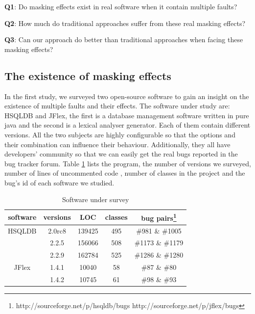 \documentclass{sig-alternate}
\begin{document}
\textbf{Q1}: Do masking effects exist in real software when it contain multiple faults?

\textbf{Q2}: How much do traditional approaches suffer from these real masking effects?

\textbf{Q3}: Can our approach do better than traditional approaches when facing these masking effects?
%

\subsection{The existence of masking effects}
In the first study, we surveyed two open-source software to gain an insight on the existence of multiple faults and their effects. The software under study are: HSQLDB and JFlex, the first is a database management software written in pure java and the second is a lexical analyser generator. Each of them contain different versions. All the two subjects are highly configurable so that the options and their combination can influence their behaviour. Additionally, they all have developers' community so that we can easily get the real bugs reported in the bug tracker forum. Table \ref{software description} lists the program, the number of versions we surveyed, number of lines of uncommented code , number of classes in the project and the bug's id of each software we studied.

\begin{table}\renewcommand{\arraystretch}{1.3}
\caption{Software under survey}
\label{software description}
\begin{tabular}{c|c|c|c|c} \hline
software & versions & LOC & classes & bug pairs\footnote{ http://sourceforge.net/p/hsqldb/bugs
http://sourceforge.net/p/jflex/bugs  } \\ \hline

HSQLDB  &2.0rc8 & 139425 & 495 &  \#981 \& \#1005\\
	   &2.2.5 & 156066 & 508 & \#1173 \&  \#1179\\
	    &2.2.9 & 162784 &525 & \#1286 \& \#1280\\
JFlex  &1.4.1 &  10040 &58 & \#87 \& \#80 \\
      &1.4.2 &  10745 &61 &  \#98 \& \#93  \\
\hline\end{tabular}
\end{table}
\end{document}
